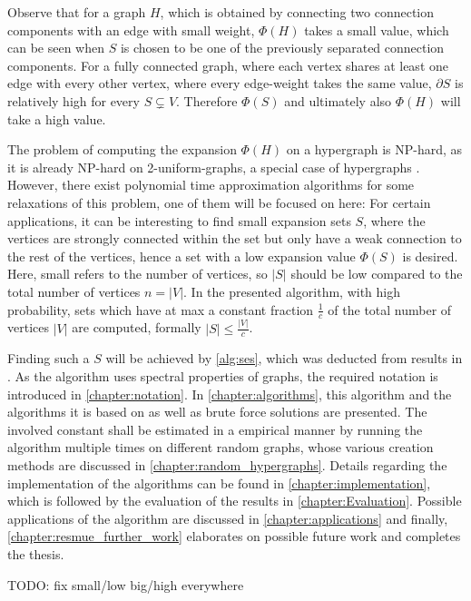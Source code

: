 Observe that for a graph $H$, which is obtained by connecting two connection components with an edge with small weight, $\Phi(H)$ takes a small value, which can be seen when $S$ is chosen to be one of the previously separated connection components. For a fully connected graph, where each vertex shares at least one edge with every other vertex, where every edge-weight takes the same value,  $\partial S$ is relatively high for every $S\subsetneq V$. Therefore $\Phi(S)$ and ultimately also $\Phi(H)$ will take a high value.

The problem of computing the expansion $\Phi(H)$ on a hypergraph is NP-hard, as it is already NP-hard on 2-uniform-graphs, a special case of hypergraphs \cite{kaibel2004expansion}.
However, there exist polynomial time approximation algorithms for some relaxations of this problem, one of them will be focused on here:
For certain applications, it can be interesting to find small expansion sets $S$, where the vertices are strongly connected within the set but only have a weak connection to the rest of the vertices, hence a set with a low expansion value $\Phi(S)$ is desired. Here, small refers to the number of vertices, so $|S|$ should be low compared to the total number of vertices $n = |V|$. In the presented algorithm, with high probability, sets which have at max a constant fraction $\frac{1}{c}$ of the total number of vertices $|V|$ are computed, formally $|S|\le \frac{|V|}{c}$.

Finding such a $S$ will be achieved by \cref{alg:ses}, which was deducted from results in \cite{ChanLTZ16}. As the algorithm uses spectral properties of graphs, the required notation is introduced in \cref{chapter:notation}. In \cref{chapter:algorithms}, this algorithm and the algorithms it is based on as well as brute force solutions are presented.
The involved constant shall be estimated in a empirical manner by running the algorithm multiple times on different random graphs, whose various creation methods are discussed in \cref{chapter:random_hypergraphs}.  Details regarding the implementation of the algorithms can be found in \cref{chapter:implementation}, which is followed by the evaluation of the results in \cref{chapter:Evaluation}. Possible applications of the algorithm are discussed in \cref{chapter:applications} and finally, \cref{chapter:resmue_further_work} elaborates on possible future work and completes the thesis.






TODO: fix small/low big/high everywhere



